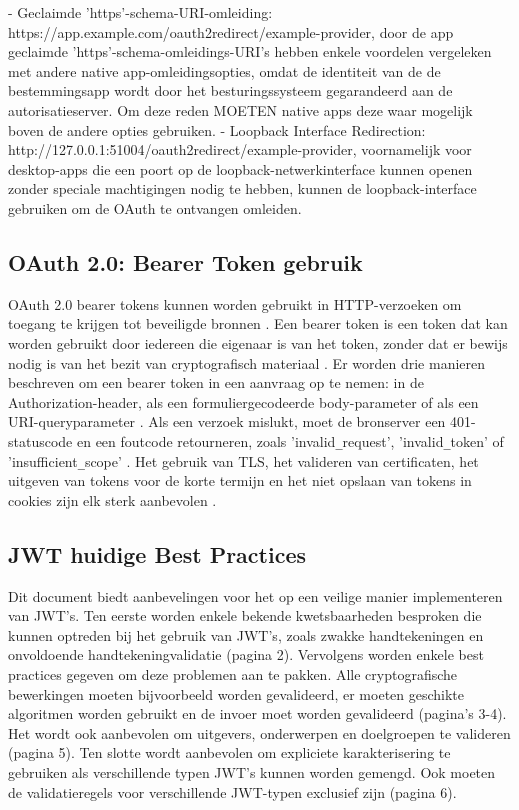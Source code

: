 \newline
- Geclaimde 'https'-schema-URI-omleiding: https://app.example.com/oauth2redirect/example-provider, door de app geclaimde 'https'-schema-omleidings-URI's hebben enkele voordelen vergeleken met andere native app-omleidingsopties, omdat de identiteit van de de bestemmingsapp wordt door het besturingssysteem gegarandeerd aan de autorisatieserver. Om deze reden MOETEN native apps deze waar mogelijk boven de andere opties gebruiken.
\newline
- Loopback Interface Redirection: http://127.0.0.1:51004/oauth2redirect/example-provider, voornamelijk voor desktop-apps die een poort op de loopback-netwerkinterface kunnen openen zonder speciale machtigingen nodig te hebben, kunnen de loopback-interface gebruiken om de OAuth te ontvangen omleiden.


\subsection{OAuth 2.0: Bearer Token gebruik}%
\label{subsec:oauth-2.0-bearer-token-gebruik}
OAuth 2.0 bearer tokens kunnen worden gebruikt in HTTP-verzoeken om toegang te krijgen tot beveiligde bronnen \autocite[p.~{Section 1.0}]{Jones2012}.
Een bearer token is een token dat kan worden gebruikt door iedereen die eigenaar is van het token, zonder dat er bewijs nodig is van het bezit van cryptografisch materiaal \autocite[p.~{Section 1.2}]{Jones2012}.
Er worden drie manieren beschreven om een bearer token in een aanvraag op te nemen: in de Authorization-header, als een formuliergecodeerde body-parameter of als een URI-queryparameter \autocite[p.~{Section 2.1}]{Jones2012}. Als een verzoek mislukt, moet de bronserver een 401-statuscode en een foutcode retourneren, zoals 'invalid\verb|_|request', 'invalid\verb|_|token' of 'insufficient\verb|_|scope' \autocite[p.~{Section 3.0}]{Jones2012}.
Het gebruik van TLS, het valideren van certificaten, het uitgeven van tokens voor de korte termijn en het niet opslaan van tokens in cookies zijn elk sterk aanbevolen \autocite[p.~{Section 5.0}]{Jones2012}.


\subsection{JWT huidige Best Practices}%
\label{subsec:jwt-huidige-best-practices}
Dit document \autocite{Sheffer2020} biedt aanbevelingen voor het op een veilige manier implementeren van JWT's. Ten eerste worden enkele bekende kwetsbaarheden besproken die kunnen optreden bij het gebruik van JWT's, zoals zwakke handtekeningen en onvoldoende handtekeningvalidatie (pagina 2).
Vervolgens worden enkele best practices gegeven om deze problemen aan te pakken. Alle cryptografische bewerkingen moeten bijvoorbeeld worden gevalideerd, er moeten geschikte algoritmen worden gebruikt en de invoer moet worden gevalideerd (pagina's 3-4). Het wordt ook aanbevolen om uitgevers, onderwerpen en doelgroepen te valideren (pagina 5).
Ten slotte wordt aanbevolen om expliciete karakterisering te gebruiken als verschillende typen JWT's kunnen worden gemengd. Ook moeten de validatieregels voor verschillende JWT-typen exclusief zijn (pagina 6).



